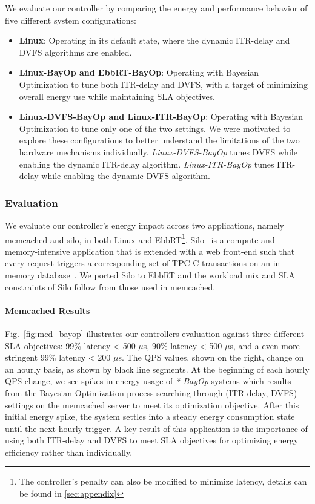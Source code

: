 We evaluate our controller by comparing the energy and performance behavior of five different system configurations:
\begin{itemize}
    \item \textbf{Linux}: Operating in its default state, where the dynamic ITR-delay and DVFS  algorithms are enabled.
    \item \textbf{Linux-BayOp and EbbRT-BayOp}: Operating with Bayesian Optimization to tune both ITR-delay and DVFS, with a target of minimizing overall energy use while maintaining SLA objectives.
    \item \textbf{Linux-DVFS-BayOp and Linux-ITR-BayOp}: Operating with Bayesian Optimization to tune only one of the two settings. We were motivated to explore these configurations to better understand the limitations of the two hardware mechanisms individually. \textit{Linux-DVFS-BayOp} tunes DVFS while enabling the dynamic ITR-delay algorithm. \textit{Linux-ITR-BayOp} tunes ITR-delay while enabling the dynamic DVFS algorithm.
\end{itemize}


\subsubsection{Evaluation}
We evaluate our controller's energy impact across two
applications, namely memcached and silo, in both Linux and EbbRT\footnote{The controller's penalty can also be modified to minimize latency, details can be found in \cref{sec:appendix}}. Silo~\cite{mcdsilo, zygos} is a compute and memory-intensive application that is extended with a web front-end such that every request triggers a corresponding set of TPC-C transactions on an in-memory database~\cite{silo}. We ported Silo to EbbRT and the workload mix and SLA constraints of Silo follow from those used in memcached.


\paragraph{Memcached Results}
Fig.~\ref{fig:mcd_bayop} illustrates our controllers evaluation against three different SLA objectives: 99\% latency < 500 $\mu$s, 90\% latency < 500 $\mu$s, and a even more stringent 99\% latency < 200 $\mu$s. The QPS values, shown on the right, change on an hourly basis, as shown by black line segments. At the beginning of each hourly QPS change, we see spikes in energy usage of \textit{*-BayOp} systems which results from the Bayesian Optimization process searching through (ITR-delay,  DVFS) settings on the memcached server to meet its optimization objective. After this initial energy spike, the system settles into a steady energy consumption state until the next hourly trigger. A key result of this application is the importance of using both ITR-delay and DVFS to meet SLA objectives for optimizing energy efficiency rather than individually.

